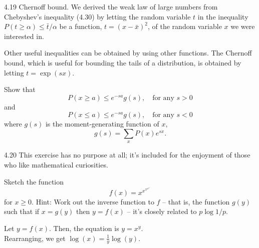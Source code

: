\documentclass[12pt, a4paper]{article}
\begin{document}
\begin{prob}{4.19}
    Chernoff bound. We derived the weak law of large numbers from Chebyshev's inequality (4.30) by letting the random variable $t$ in the inequality $P(t \ge \alpha) \le \bar{t}/\alpha$ be a function, $t = (x - \bar{x})^2$, of the random variable $x$ we were interested in.

\vspace{0.5em}
\noindent Other useful inequalities can be obtained by using other functions. The Chernoff bound, which is useful for bounding the tails of a distribution, is obtained by letting $t = \exp(sx)$.

\vspace{0.5em}
\noindent Show that
\begin{equation}\tag{4.41}
P(x \ge a) \le e^{-sa}g(s), \quad \text{for any } s > 0
\end{equation}
and
\begin{equation}\tag{4.42}
P(x \le a) \le e^{-sa}g(s), \quad \text{for any } s < 0
\end{equation}
where $g(s)$ is the moment-generating function of $x$,
\begin{equation}\tag{4.43}
g(s) = \sum_x P(x) e^{sx}.
\end{equation}
\end{prob}
\begin{sol}
\end{sol}
\bigskip

\begin{prob}{4.20}
    This exercise has no purpose at all; it's included for the enjoyment of those who like mathematical curiosities.

\vspace{0.5em}
\noindent Sketch the function
\begin{equation}\tag{4.44}
f(x) = x^{x^{x^{x^{x^{\cdot^{\cdot^{\cdot}}}}}}}
\end{equation}
for $x \ge 0$. Hint: Work out the inverse function to $f$ -- that is, the function $g(y)$ such that if $x = g(y)$ then $y = f(x)$ -- it's closely related to $p \log 1/p$.
\end{prob}
\begin{sol}
    Let $y = f(x)$. Then, the equation is $y = x^y$. \\
    Rearranging, we get $\log(x) = \frac{1}{y} \log(y)$.
\end{sol}
\bigskip
\end{document}

